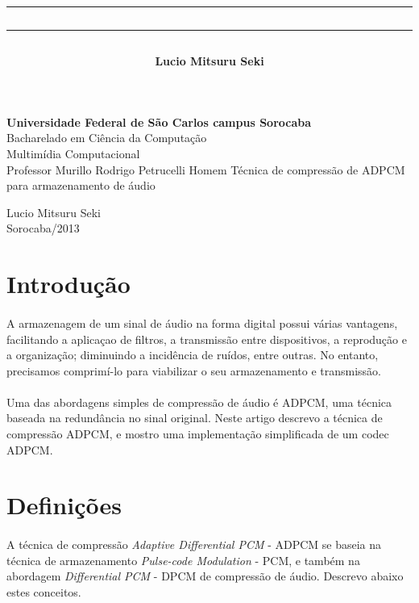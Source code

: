 \documentclass[a4paper,12pt]{article}
\title{\hrule\vspace{1pt}\hrule\vspace{25pt}}
\author{\LARGE \bf Lucio Mitsuru Seki}
\date{\Large \bf Janeiro de 2012 \vspace{25pt}\hrule\vspace{1pt}\hrule}
\begin{document}
\pagestyle{empty}
\onehalfspacing
\begin{center}
{\Large \bf Universidade Federal de São Carlos campus Sorocaba}\\[15pt]
{\Large Bacharelado em Ciência da Computação}\\[15pt]
{\Large Multimídia Computacional\\ Professor Murillo Rodrigo Petrucelli Homem}
\vfill
\vfill
{\Large Técnica de compressão de ADPCM para armazenamento de áudio}
\vfill
\vfill

{\Large Lucio Mitsuru Seki}\\
\bigskip
{Sorocaba/2013}
\end{center}

\newpage

\section{Introdução}

\paragraph{}
A armazenagem de um sinal de áudio na forma digital possui várias vantagens, facilitando a aplicaçao de filtros, a transmissão entre dispositivos, a reprodução e a organização; diminuindo a incidência de ruídos, entre outras. No entanto, precisamos comprimí-lo para viabilizar o seu armazenamento e transmissão.

\paragraph{}
Uma das abordagens simples de compressão de áudio é ADPCM, uma técnica baseada na redundância no sinal original. Neste artigo descrevo a técnica de compressão ADPCM, e mostro uma implementação simplificada de um codec ADPCM.

\section{Definições}

\paragraph{}
A técnica de compressão \textit{Adaptive Differential PCM} - ADPCM se baseia na técnica de armazenamento \textit{Pulse-code Modulation} - PCM, e também na abordagem \textit{Differential PCM} - DPCM de compressão de áudio. Descrevo abaixo estes conceitos.
\end{document}
